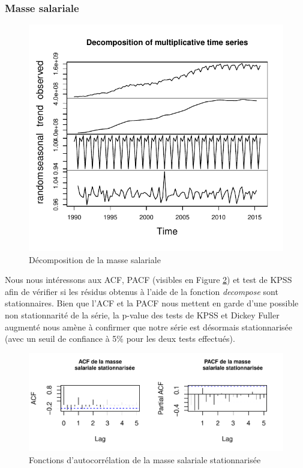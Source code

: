 \documentclass[11pt,]{article}
\begin{document}
\subsubsection{Masse salariale}\label{masse-salariale-1}

\begin{figure}[htbp]
\centering
\includegraphics{doc_files/figure-latex/unnamed-chunk-12-1.pdf}
\caption{\label{fig10} Décomposition de la masse salariale}
\end{figure}

Nous nous intéressons aux ACF, PACF (visibles en Figure \ref{fig11}) et
test de KPSS afin de vérifier si les résidus obtenus à l'aide de la
fonction \emph{decompose} sont stationnaires. Bien que l'ACF et la PACF
nous mettent en garde d'une possible non stationnarité de la série, la
p-value des tests de KPSS et Dickey Fuller augmenté nous amène à
confirmer que notre série est désormais stationnarisée (avec un seuil de
confiance à 5\% pour les deux tests effectués).

\begin{figure}[htbp]
\centering
\includegraphics{doc_files/figure-latex/unnamed-chunk-13-1.pdf}
\caption{\label{fig11} Fonctions d'autocorrélation de la masse salariale
stationnarisée}
\end{figure}
\end{document}
